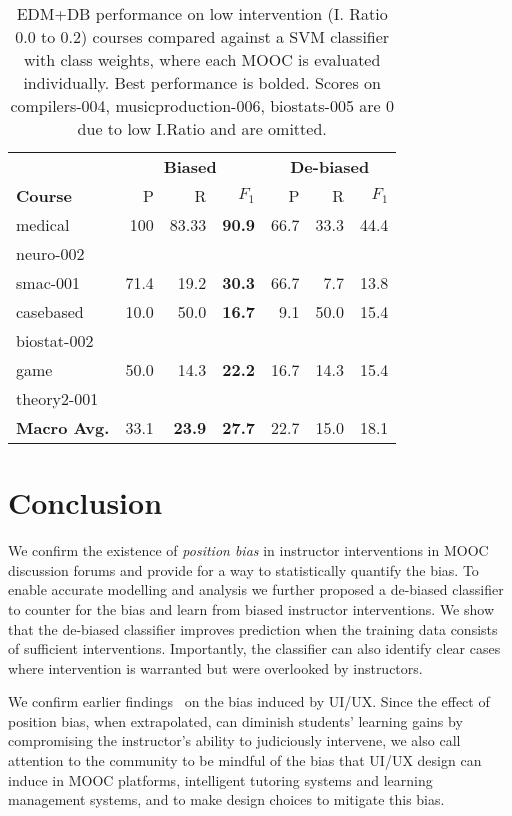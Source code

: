 \documentclass[11pt,a4paper]{article}
\begin{document}
\begin{table}
\centering
\def\arraystretch{1.15}%
\scriptsize
\begin{tabular}{|l|r|r|r||r|r|r|}
\hline
 &
 \multicolumn{3}{c||}{\textbf{Biased}} &
 \multicolumn{3}{c|}{\textbf{De-biased}} \\
 \cline{2-7}
\bf Course&  P&  R& $F_1$&  P&  R& $F_1$\\
\hline
\hline
{\sc medical} & 100& 83.33& \textbf{90.9}& 66.7& 33.3& 44.4\\
{\sc neuro-002} & & & & & & \\
\hline
{\sc smac-001} & 71.4& 19.2& \textbf{30.3}& 66.7& 7.7&  13.8\\
\hline
{\sc casebased} & 10.0& 50.0& \textbf{16.7}& 9.1& 50.0& 15.4\\
{\sc biostat-002} & & & & & & \\
\hline
{\sc game} & 50.0& 14.3& \textbf{22.2}& 16.7& 14.3& 15.4\\
{\sc theory2-001} & & & & & & \\
\hline
\hline
 \textbf{Macro Avg.}& 33.1& \textbf{23.9}& \textbf{27.7}& 22.7& 15.0& 18.1\\
\hline
\end{tabular}
\caption{EDM+DB performance on low intervention (I. Ratio 0.0 to 0.2)
  courses compared against a SVM classifier with class weights, where
  each MOOC is evaluated individually. Best performance is bolded.
  Scores on compilers-004, musicproduction-006, biostats-005 are 0 
  due to low I.Ratio and are omitted.
}
\label{tab:resultdiscuss}
\end{table}

\section{Conclusion}
\label{sect:conclusion}

We confirm the existence of \textit{position bias} in instructor
interventions in MOOC discussion forums and provide for a way to 
statistically quantify the bias. To enable accurate modelling and 
analysis we further
proposed a de-biased classifier to counter for the bias and learn 
from biased instructor interventions. We show that the de-biased 
classifier improves prediction when the training data consists of 
sufficient interventions. Importantly, the classifier can also 
identify clear cases where intervention is warranted but were 
overlooked by instructors.

We confirm earlier findings~\cite{wise2012,starburst2016} 
on the bias induced by UI/UX. Since the effect of 
position bias, when extrapolated, can  
diminish students' learning gains by compromising the 
instructor's ability to judiciously intervene, 
we also call attention to the community to 
be mindful of the bias that UI/UX design can induce in MOOC 
platforms, intelligent tutoring systems and learning management 
systems, and to make design choices to mitigate this bias.
\end{document}
